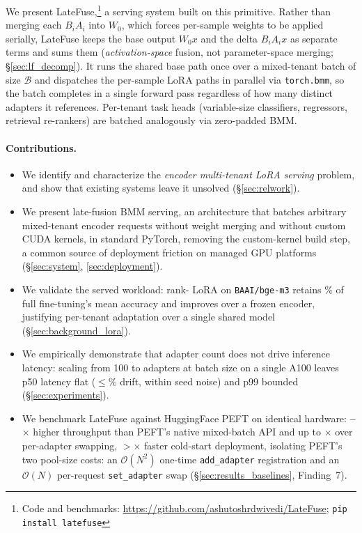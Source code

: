 \documentclass[11pt]{article}
\newcommand{\sysname}{LateFuse}
\newcommand{\codeurl}{https://github.com/ashutoshrdwivedi/LateFuse}
\begin{document}
We present \sysname,\footnote{Code and benchmarks: \url{\codeurl}; \texttt{pip install latefuse}} a serving system built on this primitive. Rather than
merging each $B_i A_i$ into $W_0$, which forces per-sample weights to be applied
serially, \sysname{} keeps the base output $W_0 x$ and the delta $B_i A_i x$ as
separate terms and sums them (\emph{activation-space} fusion, not parameter-space
merging; \S\ref{sec:lf_decomp}). It runs the shared base path once over a
mixed-tenant batch of size $\mathcal{B}$ and dispatches the per-sample LoRA paths
in parallel via \texttt{torch.bmm}, so the batch completes in a single forward
pass regardless of how many distinct adapters it references. Per-tenant task
heads (variable-size classifiers, regressors, retrieval re-rankers) are batched
analogously via zero-padded BMM.

\paragraph{Contributions.}
\begin{itemize}
  \item We identify and characterize the \emph{encoder multi-tenant LoRA
    serving} problem, and show that existing systems leave it unsolved
    (\S\ref{sec:relwork}).

  \item We present late-fusion BMM serving, an architecture that batches
    arbitrary mixed-tenant encoder requests without weight merging and
    without custom CUDA kernels, in standard PyTorch, removing the
    custom-kernel build step, a common source of deployment friction
    on managed GPU platforms (\S\ref{sec:system},
    \ref{sec:deployment}).

  \item We validate the served workload: rank-\HeadlineRank{} LoRA on
    \texttt{BAAI/bge-m3} retains \SetfitBgeRetainsPct\% of full
    fine-tuning's mean accuracy and improves over a frozen encoder,
    justifying per-tenant adaptation over a single shared model
    (\S\ref{sec:background_lora}).

  \item We empirically demonstrate that adapter count does not drive
    inference latency: scaling from 100 to \HeadlineCapacity{} adapters at batch
    size \HeadlineBatch{} on a single A100 leaves p50 latency flat
    ($\le$\PFiftyDriftPctNHundredToFortySevenK\% drift, within seed noise) and
    p99 bounded (\S\ref{sec:experiments}).

  \item We benchmark \sysname{} against HuggingFace PEFT on identical
    hardware:
    \textbf{\SpeedupMixedMin--\SpeedupMixedMax$\times$} higher throughput
    than PEFT's native mixed-batch API and up to
    \textbf{\HeadlineSpeedupHigh$\times$} over per-adapter swapping,
    \textbf{$>$\ColdStartSpeedupMin{}$\times$} faster cold-start
    deployment, isolating PEFT's two pool-size costs: an
    $\mathcal{O}(N^2)$ one-time \texttt{add\_adapter} registration and an
    $\mathcal{O}(N)$ per-request \texttt{set\_adapter} swap
    (\S\ref{sec:results_baselines}, Finding~7).
\end{itemize}
\end{document}
